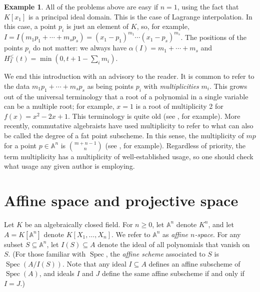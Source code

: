 \documentclass[11pt,twoside]{amsart}
\numberwithin{equation}{section}
\theoremstyle{definition}
\newtheorem{example}[theorem]{Example}
\begin{document}
\begin{example}
All of the problems above are easy if $n=1$, using the fact that
${K}[x_1]$ is a principal ideal domain. This is the case of Lagrange interpolation.
In this case, a point $p_i$ is just an element of ${K}$, so,
for example, $I=I(m_1p_1+\cdots+m_sp_s)=(x_1-p_1)^{m_1}\cdots(x_1-p_s)^{m_s}$.
The positions of the points $p_i$ do not matter: we always
have $\alpha(I)=m_1+\cdots+m_s$ and
$H^{\leq}_I(t)=\min(0,t+1-\sum_im_i)$.
\end{example}

We end this introduction with an advisory to the reader. It is common to refer to the
data $m_1p_1+\cdots+m_sp_s$ as being points $p_i$ with \emph{multiplicities} $m_i$.
This grows out of the universal terminology that a root of a polynomial in a single variable
can be a multiple root; for example, $x=1$ is a root of multiplicity 2 for $f(x)=x^2-2x+1$.
This terminology is quite old (see \cite{refSyl,refN2}, for example).
More recently, commutative algebraists have used multiplicity to refer to
what can also be called the degree of
a fat point subscheme. In this sense, the multiplicity of
$mp$ for a point $p\in{\mathbb{A}^{{n}}}$ is $\binom{m+n-1}{n}$
(see \cite[p.\ 66]{refEH}, for example).
Regardless of priority, the term multiplicity has a multiplicity of well-established usage,
so one should check what usage any given author is employing.

\section{Affine space and projective space}

Let ${K}$ be an algebraically closed field. For $n\geq0$, let ${\mathbb{A}^{{n}}}$ denote ${K}^n$, and let
$A={K}[{\mathbb{A}^{{n}}}]$ denote ${K}[X_1,\ldots, X_n]$. We refer to
${\mathbb{A}^{{n}}}$ as \emph{affine $n$-space}.
For any subset $S\subseteq {\mathbb{A}^{{n}}}$, let $I(S)\subseteq A$ denote the ideal 
of all polynomials that vanish on $S$. (For those familiar with ${\operatorname{Spec}}$,
the \emph{affine scheme} associated to $S$ 
is ${\operatorname{Spec}}(A/I(S))$. Note that any ideal $I\subseteq A$ defines an affine subscheme
of ${\operatorname{Spec}}(A)$, and ideals $I$ and $J$ define the same affine subscheme
if and only if $I=J$.)
\end{document}
